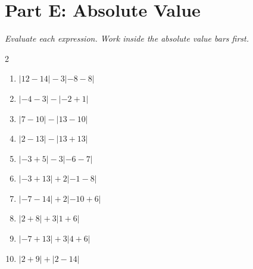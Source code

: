 \documentclass[11pt]{article}
\begin{document}
\section*{Part E: Absolute Value}
\noindent\textit{Evaluate each expression. Work inside the absolute value bars first.}
\begin{multicols}{2}
\begin{enumerate}
  \item $|12 - 14| - 3|-8 - 8|$
  \vspace{1.2cm}
  \item $|-4 - 3| - |-2 + 1|$
  \vspace{1.2cm}
  \item $|7 - 10| - |13 - 10|$
  \vspace{1.2cm}
  \item $|2 - 13| - |13 + 13|$
  \vspace{1.2cm}
  \item $|-3 + 5| - 3|-6 - 7|$
  \vspace{1.2cm}
  \item $|-3 + 13| + 2|-1 - 8|$
  \vspace{1.2cm}
  \item $|-7 - 14| + 2|-10 + 6|$
  \vspace{1.2cm}
  \item $|2 + 8| + 3|1 + 6|$
  \vspace{1.2cm}
  \item $|-7 + 13| + 3|4 + 6|$
  \vspace{1.2cm}
  \item $|2 + 9| + |2 - 14|$
  \vspace{1.2cm}
\end{enumerate}
\end{multicols}
\end{document}
